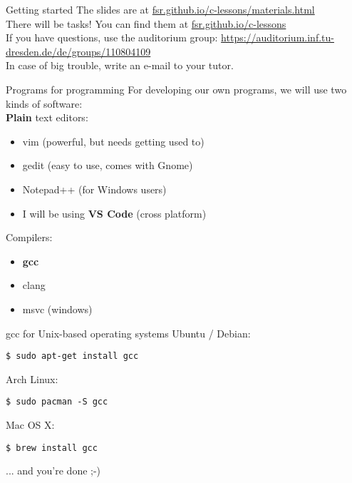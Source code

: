 \begin{frame}{Getting started}
	The slides are at \href{https://fsr.github.io/c-lessons/materials.html}{fsr.github.io/c-lessons/materials.html}\\
	\bigskip
	There will be tasks! You can find them at \href{http://fsr.github.io/c-lessons/}{fsr.github.io/c-lessons}\\
	\bigskip
	If you have questions, use the auditorium group: \href{https://auditorium.inf.tu-dresden.de/de/groups/110804109}{https://auditorium.inf.tu-dresden.de/de/groups/110804109}\\
	\bigskip
	In case of big trouble, write an e-mail to your tutor.\\
\end{frame}

\begin{frame}{Programs for programming}
	For developing our own programs, we will use two kinds of software:\\
	\bigskip
	\textbf{Plain} text editors:
	\begin{itemize}
		\item vim (powerful, but needs getting used to)
		\item gedit (easy to use, comes with Gnome)
		\item Notepad++ (for Windows users)
		\bigskip
		\item I will be using \textbf{VS Code} (cross platform)
	\end{itemize}
	\bigskip
	Compilers:
	\begin{itemize}
		\item \textbf{gcc}
		\item clang
		\item msvc (windows)
	\end{itemize}
\end{frame}

\begin{frame}[fragile]{gcc for Unix-based operating systems}
	Ubuntu / Debian:
	\begin{lstlisting}[numbers=none]
$ sudo apt-get install gcc
\end{lstlisting}
	\bigskip
	Arch Linux:
	\begin{lstlisting}[numbers=none]
$ sudo pacman -S gcc
\end{lstlisting}
	\bigskip
	Mac OS X:
	\begin{lstlisting}[numbers=none]
$ brew install gcc
\end{lstlisting}
	\bigskip
	... and you're done ;-)
\end{frame}

